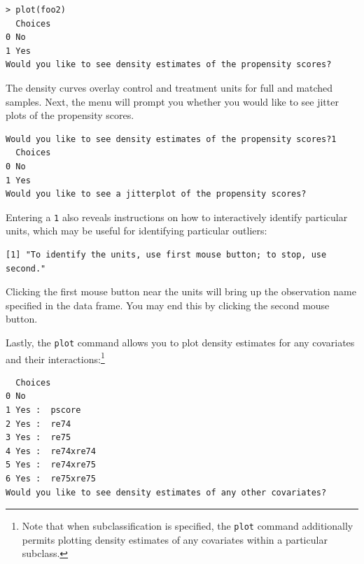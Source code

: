 \documentclass[oneside,letterpaper,titlepage]{article}
\begin{document}
\begin{verbatim}
> plot(foo2)
  Choices
0 No     
1 Yes    
Would you like to see density estimates of the propensity scores?
\end{verbatim}

The density curves overlay control and treatment units for full and
matched samples.  Next, the menu will prompt you whether you would
like to see jitter plots of the propensity scores.

\begin{verbatim}
Would you like to see density estimates of the propensity scores?1
  Choices
0 No     
1 Yes    
Would you like to see a jitterplot of the propensity scores?
\end{verbatim}

Entering a \texttt{1} also reveals instructions on how to
interactively identify particular units, which may be useful for
identifying particular outliers: 

\begin{verbatim}
[1] "To identify the units, use first mouse button; to stop, use
second."
\end{verbatim}

Clicking the first mouse button near the units will bring up the
observation name specified in the data frame.  You may end this by
clicking the second mouse button.

Lastly, the \texttt{plot} command allows you to plot density estimates
for any covariates and their interactions:\footnote{Note that when
  subclassification is specified, the \texttt{plot} command
  additionally permits plotting density estimates of any covariates
  within a particular subclass.}

\begin{verbatim}
  Choices         
0 No              
1 Yes :  pscore   
2 Yes :  re74     
3 Yes :  re75     
4 Yes :  re74xre74
5 Yes :  re74xre75
6 Yes :  re75xre75
Would you like to see density estimates of any other covariates?
\end{verbatim}
\end{document}
